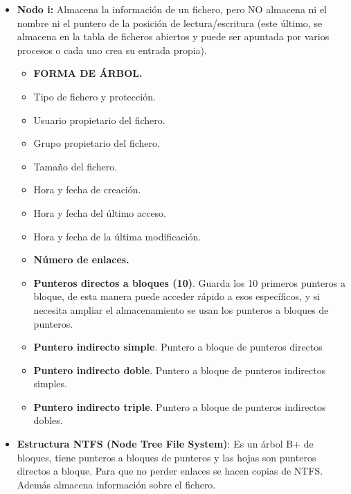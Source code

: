 \documentclass[12pt, twoside, openright]{report} %
\begin{document}
\begin{itemize}
\begin{itemize}
    \item \textbf{Nodo i:} Almacena la información de un fichero, pero NO
      almacena ni el nombre ni el puntero de la posición de
      lectura/escritura (este último, se almacena en la tabla de
      ficheros abiertos y puede ser apuntada por varios procesos o cada
      uno crea su entrada propia).
      

      \begin{itemize}
      \item \textbf{FORMA DE ÁRBOL.}
        
      \item Tipo de fichero y protección.
        
      \item Usuario propietario del fichero.
        
      \item Grupo propietario del fichero.
        
      \item Tamaño del fichero.
        
      \item Hora y fecha de creación.
        
      \item Hora y fecha del último acceso.
        
      \item Hora y fecha de la última modificación.
        
      \item \textbf{Número de enlaces.}
        
      \item \textbf{Punteros directos a bloques (10)}. Guarda los 10
        primeros punteros a bloque, de esta manera puede acceder rápido
        a esos específicos, y si necesita ampliar el almacenamiento se
        usan los punteros a bloques de punteros.
        
      \item \textbf{Puntero indirecto simple}. Puntero a bloque de punteros
        directos
        
      \item \textbf{Puntero indirecto doble}. Puntero a bloque de punteros
        indirectos simples.
        
      \item \textbf{Puntero indirecto triple}. Puntero a bloque de punteros
        indirectos dobles.
        
      \end{itemize}
    \item \textbf{Estructura NTFS (Node Tree File System)}: Es un árbol B+
      de bloques, tiene punteros a bloques de punteros y las hojas son
      punteros directos a bloque. Para que no perder enlaces se hacen
      copias de NTFS. Además almacena información sobre el fichero.
      
    \end{itemize}
  \end{itemize}



\end{document}
